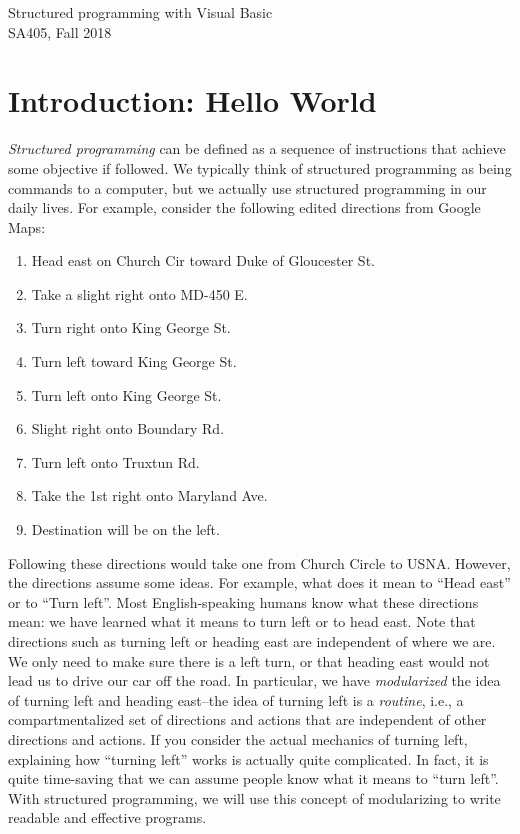 \documentclass[10pt]{article}
\begin{document}
\begin{center}
  {\sc Structured programming with Visual Basic}\\
  {\sc SA405, Fall 2018} \\
\end{center}

\section{Introduction: Hello World}
\label{sec:intro}
{\it Structured programming} can be defined as a sequence of instructions that achieve some objective if followed.
We typically think of structured programming as being commands to a computer, but we actually use structured programming in our daily lives.
For example, consider the following edited directions from Google Maps:
\begin{enumerate}
\item  Head east on Church Cir toward Duke of Gloucester St.

\item Take a slight right onto MD-450 E.
	
\item Turn right onto King George St.
	
\item Turn left toward King George St.

\item Turn left onto King George St.

\item Slight right onto Boundary Rd.

\item Turn left onto Truxtun Rd.

\item Take the 1st right onto Maryland Ave.

\item Destination will be on the left.
\end{enumerate}
Following these directions would take one from Church Circle to USNA. However, the directions assume some ideas. For example, what does it mean to ``Head east'' or to ``Turn left''. Most English-speaking humans know what these directions mean: we have learned what it means to turn left or to head east. Note that directions such as turning left or heading east are independent of where we are. We only need to make sure there is a left turn, or that heading east would not lead us to drive our car off the road.  In particular, we have {\it modularized} the idea of turning left and heading east--the idea of turning left is a {\it routine}, i.e., a compartmentalized set of directions and actions that are independent of other directions and actions. If you consider the actual mechanics of turning left, explaining how ``turning left'' works is actually quite complicated. In fact, it is quite time-saving that we can assume people know what it means to ``turn left''.
With structured programming, we will use this concept of modularizing to write readable and effective programs.
\end{document}
